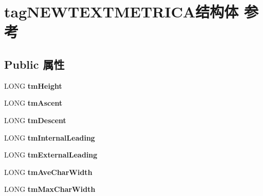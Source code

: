 \hypertarget{structtag_n_e_w_t_e_x_t_m_e_t_r_i_c_a}{}\section{tag\+N\+E\+W\+T\+E\+X\+T\+M\+E\+T\+R\+I\+C\+A结构体 参考}
\label{structtag_n_e_w_t_e_x_t_m_e_t_r_i_c_a}
\subsection*{Public 属性}
\begin{DoxyCompactItemize}
\item 
\mbox{\label{structtag_n_e_w_t_e_x_t_m_e_t_r_i_c_a_a3cf83f1dc07d4db908b8076c3704b6c9}} 
L\+O\+NG {\bfseries tm\+Height}
\item 
\mbox{\label{structtag_n_e_w_t_e_x_t_m_e_t_r_i_c_a_acbfd3691f6f0bbe83770e84a9b8da6bb}} 
L\+O\+NG {\bfseries tm\+Ascent}
\item 
\mbox{\label{structtag_n_e_w_t_e_x_t_m_e_t_r_i_c_a_a2564b0e9097b2087455181b1864be2b0}} 
L\+O\+NG {\bfseries tm\+Descent}
\item 
\mbox{\label{structtag_n_e_w_t_e_x_t_m_e_t_r_i_c_a_a17a22458fdb810c56e23987066749184}} 
L\+O\+NG {\bfseries tm\+Internal\+Leading}
\item 
\mbox{\label{structtag_n_e_w_t_e_x_t_m_e_t_r_i_c_a_afc57ce5dfffcc10f5075d4509110cc25}} 
L\+O\+NG {\bfseries tm\+External\+Leading}
\item 
\mbox{\label{structtag_n_e_w_t_e_x_t_m_e_t_r_i_c_a_a91e728b04c8757326b7672e25d442f20}} 
L\+O\+NG {\bfseries tm\+Ave\+Char\+Width}
\item 
\mbox{\label{structtag_n_e_w_t_e_x_t_m_e_t_r_i_c_a_ab28e6e2c29c9207f64cf607a4d3680fb}} 
L\+O\+NG {\bfseries tm\+Max\+Char\+Width}
\item 
\mbox{\label{structtag_n_e_w_t_e_x_t_m_e_t_r_i_c_a_af7e4f5896e770c3a299f4ded843bb1a6}} 

\end{DoxyCompactItemize}
